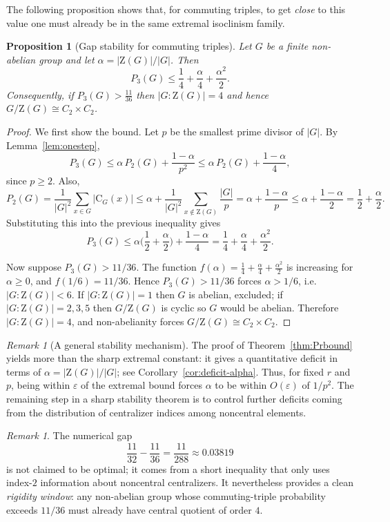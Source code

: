 \documentclass[11pt]{article}
\newtheorem{proposition}[theorem]{Proposition}
\theoremstyle{definition}
\theoremstyle{remark}
\newtheorem{remark}[theorem]{Remark}
\theoremstyle{definition}
\theoremstyle{plain}
\newcommand{\Z}{\mathrm{Z}}
\newcommand{\C}{\mathrm{C}}
\begin{document}
The following proposition shows that, for commuting triples, to get \emph{close} to this value one must already be in the same extremal isoclinism family.

\begin{proposition}[Gap stability for commuting triples]\label{prop:gap}
Let $G$ be a finite non-abelian group and let $\alpha=|\Z(G)|/|G|$.
Then
\[
P_3(G)\le \frac{1}{4}+\frac{\alpha}{4}+\frac{\alpha^2}{2}.
\]
Consequently, if $P_3(G)>\frac{11}{36}$ then $|G:\Z(G)|=4$ and hence $G/\Z(G)\cong C_2\times C_2$.
\end{proposition}

\begin{proof}
We first show the bound.
Let $p$ be the smallest prime divisor of $|G|$.
By Lemma~\ref{lem:onestep},
\[
P_3(G)\le \alpha\,P_2(G)+\frac{1-\alpha}{p^2}
\le \alpha\,P_2(G)+\frac{1-\alpha}{4},
\]
since $p\ge 2$.
Also,
\[
P_2(G)=\frac{1}{|G|^2}\sum_{x\in G}|\C_G(x)|
\le \alpha+\frac{1}{|G|^2}\sum_{x\notin\Z(G)}\frac{|G|}{p}
=\alpha+\frac{1-\alpha}{p}
\le \alpha+\frac{1-\alpha}{2}
=\frac{1}{2}+\frac{\alpha}{2}.
\]
Substituting this into the previous inequality gives
\[
P_3(G)\le \alpha\Big(\frac12+\frac{\alpha}{2}\Big)+\frac{1-\alpha}{4}
=\frac14+\frac{\alpha}{4}+\frac{\alpha^2}{2}.
\]

Now suppose $P_3(G)>11/36$.
The function $f(\alpha)=\frac14+\frac{\alpha}{4}+\frac{\alpha^2}{2}$ is increasing for $\alpha\ge 0$,
and $f(1/6)=11/36$. Hence $P_3(G)>11/36$ forces $\alpha>1/6$, i.e.\ $|G:\Z(G)|<6$.
If $|G:\Z(G)|=1$ then $G$ is abelian, excluded; if $|G:\Z(G)|=2,3,5$ then $G/\Z(G)$ is cyclic so $G$
would be abelian. Therefore $|G:\Z(G)|=4$, and non-abelianity forces $G/\Z(G)\cong C_2\times C_2$.
\end{proof}

\begin{remark}[A general stability mechanism]\label{rem:general-stability}
The proof of Theorem~\ref{thm:Prbound} yields more than the sharp extremal constant: it gives a quantitative
deficit in terms of $\alpha=|\Z(G)|/|G|$; see Corollary~\ref{cor:deficit-alpha}.
Thus, for fixed $r$ and $p$, being within $\varepsilon$ of the extremal bound forces $\alpha$ to be within
$O(\varepsilon)$ of $1/p^2$.
The remaining step in a sharp stability theorem is to control further deficits coming from the distribution of
centralizer indices among noncentral elements.
\end{remark}

\begin{remark}
The numerical gap
\[
\frac{11}{32}-\frac{11}{36}=\frac{11}{288}\approx 0.03819
\]
is not claimed to be optimal; it comes from a short inequality that only uses
index-$2$ information about noncentral centralizers.
It nevertheless provides a clean \emph{rigidity window}: any non-abelian group whose
commuting-triple probability exceeds $11/36$ must already have central quotient of order $4$.
\end{remark}
\end{document}
